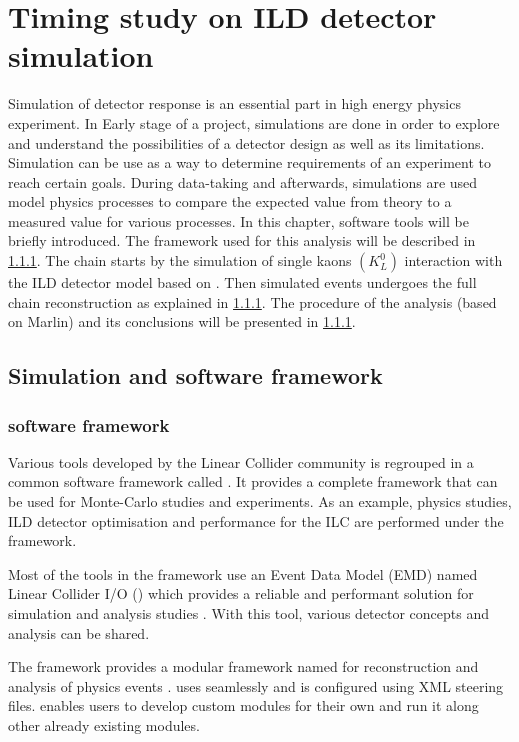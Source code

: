 \chapter{Timing study on ILD detector simulation}

Simulation of detector response is an essential part in high energy physics experiment. In Early stage of a project, simulations are done in order to explore and understand the possibilities of a detector design as well as its limitations. Simulation can be use as a way to determine requirements of an experiment to reach certain goals. During data-taking and afterwards, simulations are used model physics processes to compare  the expected value from theory to a measured value for various processes.
In this chapter, software tools will be briefly introduced. The \ilcsoft framework used for this analysis will be described in \ref{}. The chain starts by the simulation of single kaons $(K^{0}_{L})$ interaction with the ILD detector model based on \geant. Then simulated events undergoes the full chain reconstruction as explained in \ref{}. The procedure of the analysis (based on Marlin) and its conclusions will be presented in \ref{}.

\section{Simulation and software framework}

\subsection{\ilcsoft software framework}

Various tools developed by the Linear Collider community is regrouped in a common software framework called \ilcsoft \cite{ILCSOFT}. It provides a complete framework that can be used for Monte-Carlo studies and experiments. As an example, physics studies, ILD detector optimisation and performance for the ILC are performed under the \ilcsoft framework.

Most of the tools in the framework use an Event Data Model (EMD) named Linear Collider I/O (\lcio) which provides a reliable and performant solution for simulation and analysis studies \cite{LCIO}. With this tool, various detector concepts and analysis can be shared.

The \ilcsoft framework provides a modular \cpp framework named \marlin for reconstruction and analysis of physics events \cite{Marlin}. \marlin uses \lcio seamlessly and is configured using XML steering files. \marlin enables users to develop custom modules for their own and run it along other already existing modules.

